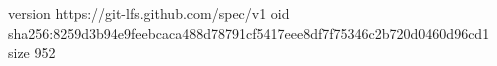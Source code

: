 version https://git-lfs.github.com/spec/v1
oid sha256:8259d3b94e9feebcaca488d78791cf5417eee8df7f75346c2b720d0460d96cd1
size 952

